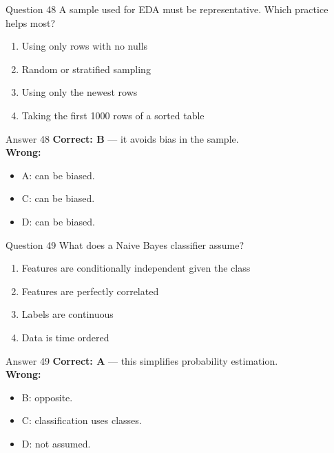 \documentclass[aspectratio=169,11pt]{beamer}
\begin{document}
\begin{frame}{Question 48}
A sample used for EDA must be representative. Which practice helps most?
\begin{enumerate}[label=\Alph*.]
\item Using only rows with no nulls
\item Random or stratified sampling
\item Using only the newest rows
\item Taking the first 1000 rows of a sorted table
\end{enumerate}
\end{frame}
\begin{frame}{Answer 48}
\textbf{Correct: B} --- it avoids bias in the sample.\\
\vspace{0.5em}
\textbf{Wrong:}
\begin{itemize}
\item A: can be biased.
\item C: can be biased.
\item D: can be biased.
\end{itemize}
\end{frame}

\begin{frame}{Question 49}
What does a Naive Bayes classifier assume?
\begin{enumerate}[label=\Alph*.]
\item Features are conditionally independent given the class
\item Features are perfectly correlated
\item Labels are continuous
\item Data is time ordered
\end{enumerate}
\end{frame}
\begin{frame}{Answer 49}
\textbf{Correct: A} --- this simplifies probability estimation.\\
\vspace{0.5em}
\textbf{Wrong:}
\begin{itemize}
\item B: opposite.
\item C: classification uses classes.
\item D: not assumed.
\end{itemize}
\end{frame}
\end{document}

